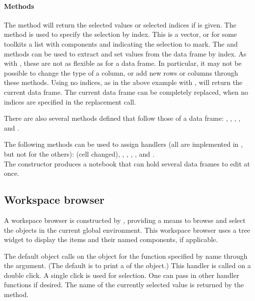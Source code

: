 \paragraph{Methods} The  method will return the
selected values or selected indices if  is
given. The  method is used to specify the
selection by index. This is a vector, or for some toolkits a list with
components  and  indicating the selection to
mark.  The \method{[}{gdf} and \method{[\ASSIGN}{gdf} methods can be
used to extract and set values from the data frame by index. As with
, these are not as flexible as for a data frame. In
particular, it may not be possible to change the type of a column, or
add new rows or columns through these methods. Using no indices, as in
the above example with , will return the current data
frame. The current data frame can be completely replaced, when no
indices are specified in the replacement call. 

There are also several methods defined that follow those of a data
frame: , ,
, , and
.

The following methods can be used to assign handlers (all are
implemented in , but not for the others):
 (cell changed),
, ,
,
, and
.
\\


The  constructor produces a notebook that can
hold several data frames to edit at once.





\subsection{Workspace browser}
\label{sec:gWidgets-workspace-browser}

A workspace browser is constructed by , providing a
means to browse and select the objects in the current global
environment. This workspace browser uses a tree widget to display the
items and their named components, if applicable.

The default  object calls
 on the object for the function specified by name
through the  argument. (The default is
to print a  of the object.) This handler is called on a
double click. A single click is used for selection. One can pass in
other handler functions if desired.  The name of the currently
selected value is returned by the  method.



